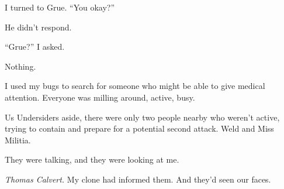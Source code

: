 I turned to Grue.  ``You okay?''



He didn't respond.



``Grue?'' I asked.



Nothing.



I used my bugs to search for someone who might be able to give medical attention.  Everyone was milling around, active, busy.



Us Undersiders aside, there were only two people nearby who weren't active, trying to contain and prepare for a potential second attack.  Weld and Miss Militia.



They were talking, and they were looking at me.



\emph{Thomas Calvert.}  My clone had informed them.  And they'd seen our faces.





